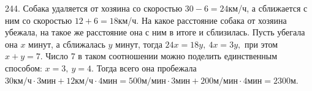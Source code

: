 244. Собака удаляется от хозяина со скоростью $30-6=24$км/ч, а сближается с ним со скоростью $12+6=18$км/ч. На какое расстояние собака от хозяина убежала, на такое же расстояние она с ним в итоге и сблизилась. Пусть убегала она $x$ минут, а сближалась $y$ минут, тогда $24x=18y,\ 4x=3y,$ при этом $x+y=7.$ Число 7 в таком соотношении можно поделить единственным способом: $x=3,\ y=4.$ Тогда всего она пробежала $30\text{км/ч}\cdot3\text{мин}+12\text{км/ч}\cdot4\text{мин}=500\text{м/мин}\cdot3\text{мин}+
200\text{м/мин}\cdot4\text{мин}=2300$м.\\
